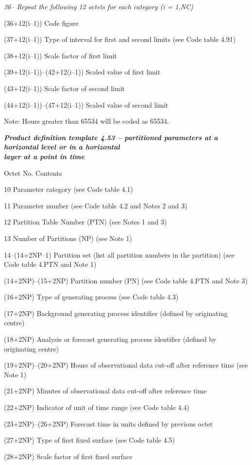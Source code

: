 \emph{36-- Repeat the following 12 octets for each category (i = 1,NC)}

(36+12(i--1)) Code figure

(37+12(i--1)) Type of interval for first and second limits (see Code table 4.91)

(38+12(i--1)) Scale factor of first limit

(39+12(i--1))--(42+12(i--1)) Scaled value of first limit

(43+12(i--1)) Scale factor of second limit

(44+12(i--1))--(47+12(i--1)) Scaled value of second limit

Note: Hours greater than 65534 will be coded as 65534.

\emph{\textbf{Product definition template 4.53 -- partitioned parameters at a horizontal level or in a horizontal\\
layer at a point in time}}

Octet No. Contents

10 Parameter category (see Code table 4.1)

11 Parameter number (see Code table 4.2 and Notes 2 and 3)

12 Partition Table Number (PTN) (see Notes 1 and 3)

13 Number of Partitions (NP) (see Note 1)

14--(14+2NP--1) Partition set (list all partition numbers in the partition) (see Code table 4.PTN and Note 1)

(14+2NP)--(15+2NP) Partition number (PN) (see Code table 4.PTN and Note 3)

(16+2NP) Type of generating process (see Code table 4.3)

(17+2NP) Background generating process identifier (defined by originating centre)

(18+2NP) Analysis or forecast generating process identifier (defined by originating centre)

(19+2NP)--(20+2NP) Hours of observational data cut-off after reference time (see Note 1)

(21+2NP) Minutes of observational data cut-off after reference time

(22+2NP) Indicator of unit of time range (see Code table 4.4)

(23+2NP)--(26+2NP) Forecast time in units defined by previous octet

(27+2NP) Type of first fixed surface (see Code table 4.5)

(28+2NP) Scale factor of first fixed surface


